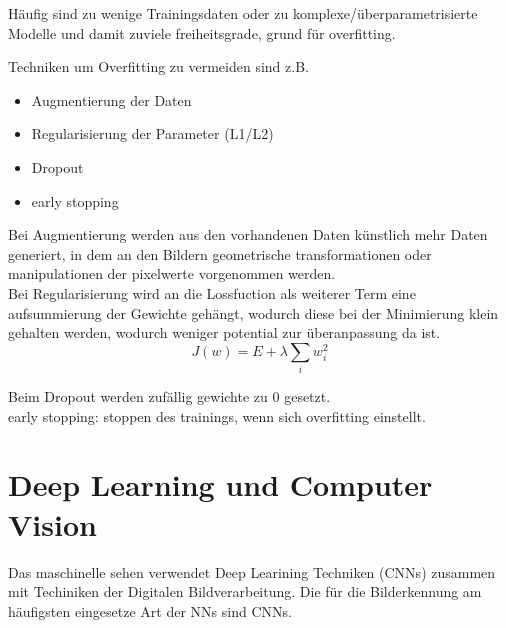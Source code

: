 %     

Häufig sind zu wenige Trainingsdaten oder zu komplexe/überparametrisierte
 Modelle und damit zuviele freiheitsgrade, grund für overfitting.



Techniken um Overfitting zu vermeiden sind z.B.
\begin{itemize}
    \item Augmentierung der Daten
    \item Regularisierung der Parameter (L1/L2)
    \item Dropout
    \item early stopping
\end{itemize}

Bei Augmentierung werden aus den vorhandenen Daten künstlich mehr 
Daten generiert, in dem an den Bildern geometrische transformationen 
oder manipulationen der pixelwerte vorgenommen werden.
\\
Bei Regularisierung wird an die Lossfuction als weiterer Term
 eine aufsummierung der Gewichte gehängt, wodurch diese bei der Minimierung 
  klein gehalten werden, wodurch weniger potential zur überanpassung da ist.
  \begin{equation}
    \label{eq:regularization}
    J(w) = E + \lambda \sum_{i} w_{i}^{2}
\end{equation}

Beim Dropout werden zufällig gewichte zu 0 gesetzt.
\\
early stopping: stoppen des trainings, wenn sich overfitting einstellt.




\section{Deep Learning und Computer Vision}\label{sec:deepl_cv}

Das maschinelle sehen verwendet Deep Learining Techniken (CNNs) zusammen 
mit Techiniken der Digitalen Bildverarbeitung.
Die für die Bilderkennung am häufigsten eingesetze Art der NNs sind CNNs.

